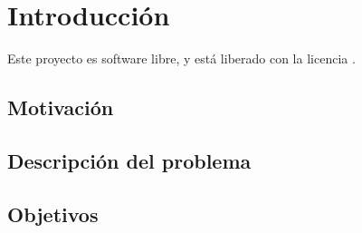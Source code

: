\chapter{Introducción}

Este proyecto es software libre, y está liberado con la licencia \cite{gplv3}.

\section{Motivación}

\section{Descripción del problema}

\section{Objetivos}
